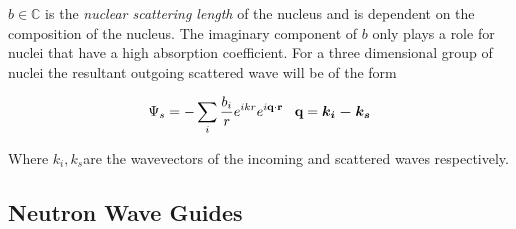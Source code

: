 $b \in \mathbb{C}$ is the \textit{nuclear scattering length} of the nucleus and is dependent on the composition of the nucleus. The imaginary component of $b$ only plays a role for nuclei that have a high absorption coefficient. For a three dimensional group of nuclei the resultant outgoing scattered wave will be of the form 

\begin{equation}
\Psi_s = -\sum \limits_i \frac{b_i}{r} e^{ikr} e^{i \textbf{q} \cdot \textbf{r}} \,\,\,\,\,  \textbf{q}= \mbox{\boldmath$k_i-k_s$}
\label{eq:latticeScatter}
\end{equation}

Where \mbox{\boldmath$k_i,k_s$}are the wavevectors of the incoming and scattered waves respectively. 

\subsection{Neutron Wave Guides}

